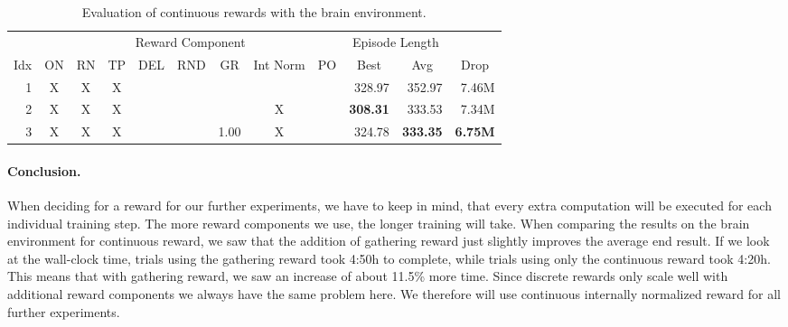 \begin{table}[htp]
    \begin{center}
        \begin{tabular}{rccccccccrrr}
            \toprule
             & \multicolumn{8}{c}{Reward Component} & \multicolumn{2}{c}{Episode Length} & \\
            \cmidrule(lr){2-9}\cmidrule(lr){10-11}
            \multicolumn{1}{c}{Idx} & \multicolumn{1}{c}{ON} & \multicolumn{1}{c}{RN} & \multicolumn{1}{c}{TP} & \multicolumn{1}{c}{DEL} & \multicolumn{1}{c}{RND} & \multicolumn{1}{c}{GR} & \multicolumn{1}{c}{Int Norm} & \multicolumn{1}{c}{PO} & \multicolumn{1}{c}{Best} & \multicolumn{1}{c}{Avg} & \multicolumn{1}{c}{Drop}\\
            \midrule
            1 & X & X & X &  &  &  &  &  & 328.97 & 352.97 & 7.46M \\
            2 & X & X & X &  &  &  & X &  & \textbf{308.31} & 333.53 & 7.34M \\
            3 & X & X & X &  &  & 1.00 & X &  & 324.78 & \textbf{333.35} & \textbf{6.75M} \\
            \bottomrule
        \end{tabular}
    \end{center}
    \caption[Evaluation of Continuous Reward with the Brain Environment]{Evaluation of continuous rewards with the brain environment.} \label{tab:Maze0122/Reward/Continuous}
\end{table}

\paragraph{Conclusion.} When deciding for a reward for our further experiments, we have to keep in mind, that every extra computation will be executed for each individual training step. The more reward components we use, the longer training will take. When comparing the results on the brain environment for continuous reward, we saw that the addition of gathering reward just slightly improves the average end result. If we look at the wall-clock time, trials using the gathering reward took 4:50h to complete, while trials using only the continuous reward took 4:20h. This means that with gathering reward, we saw an increase of about 11.5\% more time. Since discrete rewards only scale well with additional reward components we always have the same problem here. We therefore will use continuous internally normalized reward for all further experiments.


